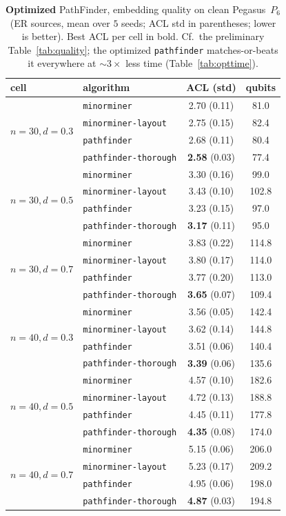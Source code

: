 \documentclass[acmsmall,anonymous,nonacm]{acmart}
\begin{document}
\begin{table}[t]
\caption{\textbf{Optimized} PathFinder, embedding quality on clean Pegasus~$P_6$
(ER sources, mean over $5$ seeds; ACL std in parentheses; lower is better). Best
ACL per cell in bold. Cf.\ the preliminary Table~\ref{tab:quality}; the optimized
\texttt{pathfinder} matches-or-beats it everywhere at ${\sim}3\times$ less time
(Table~\ref{tab:opttime}).}
\label{tab:optquality}
\small
\begin{tabular}{llcc}
\toprule
cell & algorithm & ACL (std) & qubits \\
\midrule
\multirow{4}{*}{$n{=}30,d{=}0.3$}
 & \texttt{minorminer}          & 2.70 (0.11) & 81.0 \\
 & \texttt{minorminer-layout}   & 2.75 (0.15) & 82.4 \\
 & \texttt{pathfinder}          & 2.68 (0.11) & 80.4 \\
 & \texttt{pathfinder-thorough} & \textbf{2.58} (0.03) & 77.4 \\
\midrule
\multirow{4}{*}{$n{=}30,d{=}0.5$}
 & \texttt{minorminer}          & 3.30 (0.16) & 99.0 \\
 & \texttt{minorminer-layout}   & 3.43 (0.10) & 102.8 \\
 & \texttt{pathfinder}          & 3.23 (0.15) & 97.0 \\
 & \texttt{pathfinder-thorough} & \textbf{3.17} (0.11) & 95.0 \\
\midrule
\multirow{4}{*}{$n{=}30,d{=}0.7$}
 & \texttt{minorminer}          & 3.83 (0.22) & 114.8 \\
 & \texttt{minorminer-layout}   & 3.80 (0.17) & 114.0 \\
 & \texttt{pathfinder}          & 3.77 (0.20) & 113.0 \\
 & \texttt{pathfinder-thorough} & \textbf{3.65} (0.07) & 109.4 \\
\midrule
\multirow{4}{*}{$n{=}40,d{=}0.3$}
 & \texttt{minorminer}          & 3.56 (0.05) & 142.4 \\
 & \texttt{minorminer-layout}   & 3.62 (0.14) & 144.8 \\
 & \texttt{pathfinder}          & 3.51 (0.06) & 140.4 \\
 & \texttt{pathfinder-thorough} & \textbf{3.39} (0.06) & 135.6 \\
\midrule
\multirow{4}{*}{$n{=}40,d{=}0.5$}
 & \texttt{minorminer}          & 4.57 (0.10) & 182.6 \\
 & \texttt{minorminer-layout}   & 4.72 (0.13) & 188.8 \\
 & \texttt{pathfinder}          & 4.45 (0.11) & 177.8 \\
 & \texttt{pathfinder-thorough} & \textbf{4.35} (0.08) & 174.0 \\
\midrule
\multirow{4}{*}{$n{=}40,d{=}0.7$}
 & \texttt{minorminer}          & 5.15 (0.06) & 206.0 \\
 & \texttt{minorminer-layout}   & 5.23 (0.17) & 209.2 \\
 & \texttt{pathfinder}          & 4.95 (0.06) & 198.0 \\
 & \texttt{pathfinder-thorough} & \textbf{4.87} (0.03) & 194.8 \\
\bottomrule
\end{tabular}
\end{table}
\end{document}
